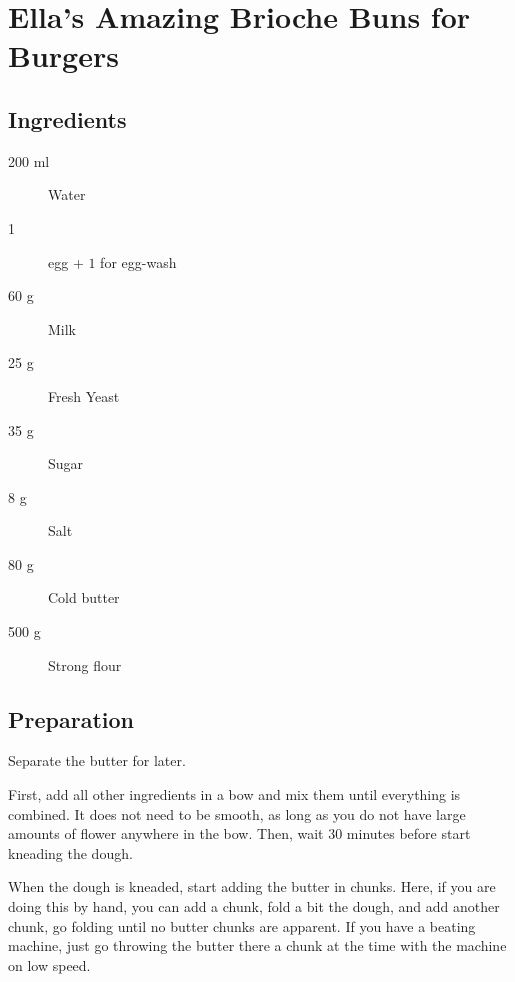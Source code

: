 \setchapterpreamble[u]{\margintoc}
\chapter{Ella's Amazing Brioche Buns for Burgers}\label{burger buns}

\section{Ingredients}

\begin{multicols}{2}
\begin{description}
	\item[200 ml] Water
	\item[1] egg + $1$ for egg-wash
	\item[60 g] Milk
	\item[25 g] Fresh Yeast
	\item[35 g] Sugar
	\item[8 g] Salt
	\item[80 g] Cold butter
	\item[500 g] Strong flour
\end{description}
\end{multicols}	

\section{Preparation}
Separate the butter for later.

First, add all other ingredients in a bow and mix them until everything is combined. It does not need to be smooth, as long as you do not have large amounts of flower anywhere in the bow.
%
Then, wait $30$ minutes before start kneading the dough.

When the dough is kneaded, start adding the butter in chunks.
%
Here, if you are doing this by hand, you can add a chunk, fold a bit the dough, and add another chunk, go folding until no butter chunks are apparent. 
%
If you have a beating machine, just go throwing the butter there a chunk at the time with the machine on low speed.

